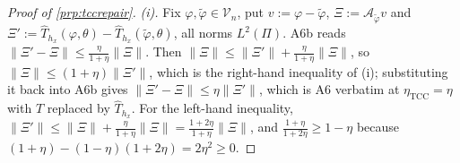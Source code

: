 \begin{proof}[Proof of \cref{prp:tccrepair}]
\emph{(i).} Fix $\varphi,\tilde\varphi\in\mathcal V_n$, put $v:=\varphi-\tilde\varphi$,
$\Xi:=\hat{\mathcal A}_{\tilde\varphi}v$ and
$\Xi':=\hat T_{h_x}(\varphi,\theta)-\hat T_{h_x}(\tilde\varphi,\theta)$, all norms $L^{2}(\Pi)$.
A6b reads $\|\Xi'-\Xi\|\le\frac{\eta}{1+\eta}\|\Xi\|$. Then
$\|\Xi\|\le\|\Xi'\|+\frac{\eta}{1+\eta}\|\Xi\|$, so
$\|\Xi\|\le(1+\eta)\|\Xi'\|$, which is the right-hand inequality of (i); substituting it
back into A6b gives $\|\Xi'-\Xi\|\le\eta\|\Xi'\|$, which is A6 verbatim at
$\eta_{\mathrm{TCC}}=\eta$ with $\hat T$ replaced by $\hat T_{h_x}$. For the left-hand inequality,
$\|\Xi'\|\le\|\Xi\|+\frac{\eta}{1+\eta}\|\Xi\|=\frac{1+2\eta}{1+\eta}\|\Xi\|$,
and $\frac{1+\eta}{1+2\eta}\ge1-\eta$ because $(1+\eta)-(1-\eta)(1+2\eta)=2\eta^{2}\ge0$.


\end{proof}
